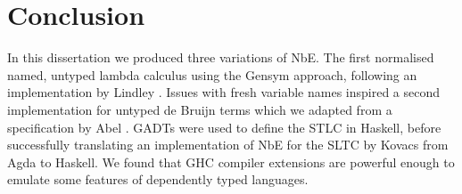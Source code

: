 \chapter{Conclusion}
\label{chap:conclusion}


% 


In this dissertation we produced three variations of NbE. The first normalised named, untyped lambda calculus using the Gensym approach, following an implementation by Lindley \cite{slides}. Issues with fresh variable names inspired a second implementation for untyped de Bruijn terms which we adapted from a specification by Abel \cite{deBruijn}. GADTs were used to define the STLC in Haskell, before successfully translating an implementation of NbE for the SLTC by Kovacs \cite{AgdaNbe} from Agda to Haskell. We found that GHC compiler extensions are powerful enough to emulate some features of dependently typed languages.

